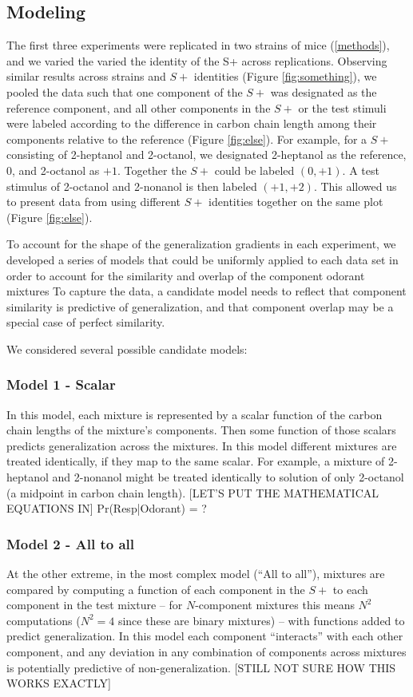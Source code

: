 \subsection{Modeling}

The first three experiments were replicated in two strains of mice (\ref{methods}), and we varied the varied the identity of the S+ across replications.  Observing similar results across strains and $S+$ identities (Figure \ref{fig:something}), we pooled the data such that one component of the $S+$ was designated as the reference component, and all other components in the $S+$ or the test stimuli were labeled according to the difference in carbon chain length among their components relative to the reference (Figure \ref{fig:else}).  For example, for a $S+$ consisting of 2-heptanol and 2-octanol, we designated 2-heptanol as the reference, $0$, and 2-octanol as $+1$.  Together the $S+$ could be labeled $(0,+1)$.  A test stimulus of 2-octanol and 2-nonanol is then labeled $(+1,+2)$.  This allowed us to present data from using different $S+$ identities together on the same plot (Figure \ref{fig:else}).  

To account for the shape of the generalization gradients in each experiment, we developed a series of models that could be uniformly applied to each data set in order to account for  the similarity and overlap of the component odorant mixtures  To capture the data, a candidate model needs to reflect that component similarity is predictive of generalization, and that component overlap may be a special case of perfect similarity.  

We considered several possible candidate models:

\subsubsection{Model 1 - Scalar}
In this model, each mixture is represented by a scalar function of the carbon chain lengths of the mixture’s components.  Then some function of those scalars predicts generalization across the mixtures.  In this model different mixtures are treated identically, if they map to the same scalar.  For example, a mixture of 2-heptanol and 2-nonanol might be treated identically to solution of only 2-octanol (a midpoint in carbon chain length).  [LET’S PUT THE  MATHEMATICAL EQUATIONS IN]
Pr(Resp|Odorant) =  ? 

\subsubsection{Model 2 - All to all}
At the other extreme, in the most complex model (``All to all''), mixtures are compared by computing a function of each component in the $S+$ to each component in the test mixture -- for $N$-component mixtures this means $N^2$ computations ($N^2 = 4$ since these are binary mixtures) -- with functions added to predict generalization.  In this model each component ``interacts'' with each other component, and any deviation in any combination of components across mixtures is potentially predictive of non-generalization.  
[STILL NOT SURE HOW THIS WORKS EXACTLY]

